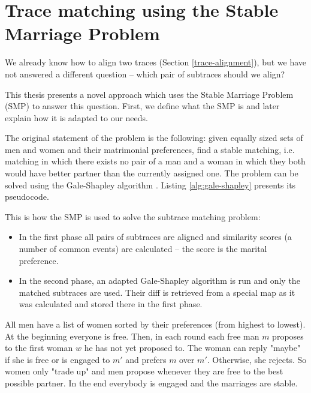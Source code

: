 \section{Trace matching using the Stable Marriage Problem}
\label{trace-matching}

We already know how to align two traces (Section \ref{trace-alignment}), but we have not
answered a different question -- which pair of subtraces should we align?

This thesis presents a novel approach which uses the Stable Marriage Problem (SMP) to answer this question.
First, we define what the SMP is and later explain how it is adapted to our needs.

The original statement of the problem is the following: 
given equally sized sets of men and women and their matrimonial preferences,
find a stable matching, i.e. matching in which there exists no pair of a man and a woman 
in which they both would have better partner than the currently assigned one.
The problem can be solved using the Gale-Shapley algorithm \cite{gale-shapley}. 
Listing \ref{alg:gale-shapley} presents its pseudocode.



This is how the SMP is used to solve the subtrace matching problem:
\begin{itemize}
  \item In the first phase all pairs of subtraces are aligned and similarity scores (a number of common events) 
  		    are calculated -- the score is the marital preference.
  \item In the second phase, an adapted Gale-Shapley algorithm is run and only the matched subtraces
           are used. Their diff is retrieved from a special map as it was calculated and stored there in the first phase.
\end{itemize}

All men have a list of women sorted by their preferences (from highest to lowest).
At the beginning everyone is free. Then, in each round each free man $m$ proposes to the first woman $w$ he has not yet proposed to.
The woman can reply "maybe" if she is free or is engaged to $m'$ and prefers $m$ over $m'$. Otherwise, she rejects.
So women only "trade up" and men propose whenever they are free to the best possible partner.
In the end everybody is engaged and the marriages are stable.

